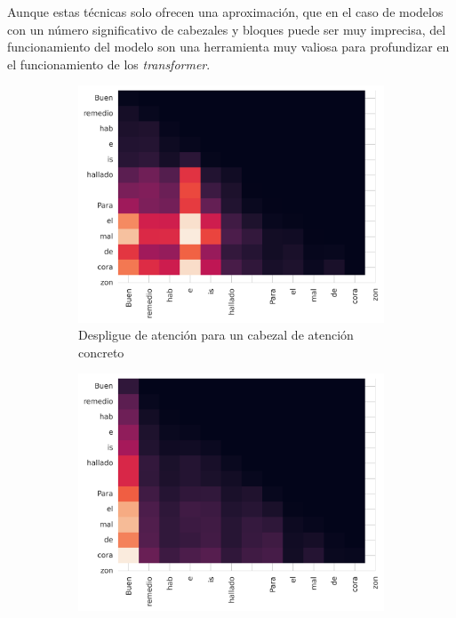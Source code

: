 Aunque estas técnicas solo ofrecen una aproximación, que en el caso de modelos con un número significativo de cabezales y bloques puede ser muy imprecisa, del funcionamiento del modelo son una herramienta muy valiosa para profundizar en el funcionamiento de los \textit{transformer}. 

\begin{figure}[tb]
    \centering
    \begin{subfigure}[b]{0.49\textwidth}
        \centering
        \includegraphics[width=\textwidth]{figures/chapter5/rollout_4.png}
        \caption{Despligue de atención para un cabezal de atención concreto}
    \end{subfigure}
    \smallskip
    \begin{subfigure}[b]{0.49\textwidth}
        \centering
        \includegraphics[width=\textwidth]{figures/chapter5/rollout_avg.png}

\end{subfigure}
\end{figure}
